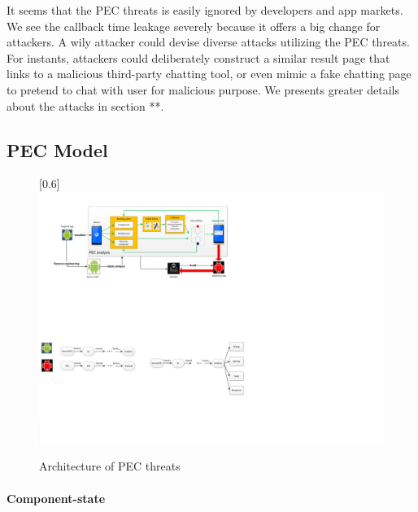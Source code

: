 \documentclass{sig-alternate-05-2015}
\begin{document}
It seems that the PEC threats is easily ignored by developers and app markets. We see the callback time leakage severely because it offers a big change for attackers. A wily attacker could devise diverse attacks utilizing the PEC threats. For instants, attackers could deliberately construct a similar result page that links to a malicious third-party chatting tool, or even mimic a fake chatting page to pretend to chat with user for malicious purpose. We presents greater details about the attacks in section **.

\subsection{PEC Model} 
\begin{figure}[t]
\centering
\scalebox{0.8}[0.6]{\includegraphics{principle.pdf}}
\caption{\label{} Architecture of PEC threats}
\end{figure}



\paragraph{Component-state}
\end{document}
